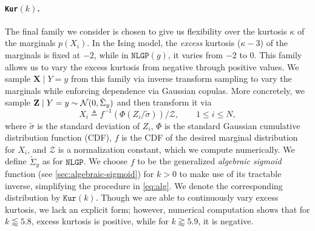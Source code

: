 \paragraph{\texttt{Kur}$(k)$.}\hspace{-2pt}
The final family we consider is chosen to give us flexibility over the kurtosis $\kappa$ of the marginals $p(X_i)$.
In the Ising model, the \emph{excess} kurtosis ($\kappa - 3$) of the marginals is fixed at $-2$, while in $\texttt{NLGP}(g)$, it varies from $-2$ to $0$.
This family allows us to vary the excess kurtosis from negative through positive values.
We sample $\mathbf{X} \mid Y = y$ from this family via inverse transform sampling to vary the marginals while enforcing dependence via Gaussian copulas.
More concretely, we sample $\mathbf{Z} \mid Y = y \sim \operatorname{\mathcal{N}}(0, \tilde{\Sigma}_y)$ and then transform it via
\begin{equation}
    X_i \triangleq f^{-1}( \Phi( Z_i / \tilde{\sigma} )) / \mathcal{Z}, \qquad 1 \leq i \leq N, \label{eq:alg}
\end{equation}
where $\tilde{\sigma}$ is the standard deviation of $Z_i$, $\Phi$ is the standard Gaussian cumulative distribution function (CDF), $f$ is the CDF of the desired marginal distribution for $X_i$, and $\mathcal{Z}$ is a normalization constant, which we compute numerically.
We define $\tilde{\Sigma}_y$ as for $\texttt{NLGP}$.
We choose $f$ to be the generalized \emph{algebraic sigmoid} function (see \cref{sec:algebraic-sigmoid})
for $k > 0$ to make use of its tractable inverse, simplifying the procedure in \cref{eq:alg}.
We denote the corresponding distribution by $\texttt{Kur}(k)$.
Though we are able to continuously vary excess kurtosis, we lack an explicit form; however, numerical computation shows that for $k \lessapprox 5.8$, excess kurtosis is positive, while for $k \gtrapprox 5.9$, it is negative.
